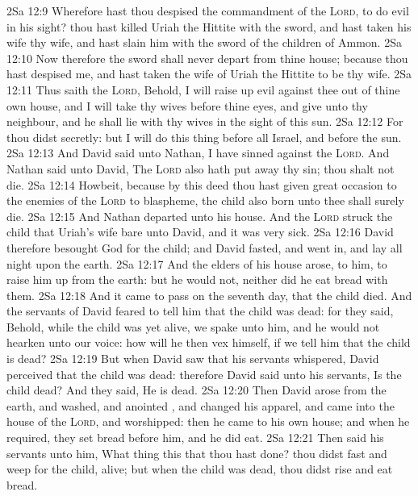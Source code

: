 \vs 2Sa 12:9 Wherefore hast thou despised the commandment of the \textsc{Lord}, to do evil in his sight? thou hast killed Uriah the Hittite with the sword, and hast taken his wife  thy wife, and hast slain him with the sword of the children of Ammon.
\vs 2Sa 12:10 Now therefore the sword shall never depart from thine house; because thou hast despised me, and hast taken the wife of Uriah the Hittite to be thy wife.
\vs 2Sa 12:11 Thus saith the \textsc{Lord}, Behold, I will raise up evil against thee out of thine own house, and I will take thy wives before thine eyes, and give  unto thy neighbour, and he shall lie with thy wives in the sight of this sun.
\vs 2Sa 12:12 For thou didst  secretly: but I will do this thing before all Israel, and before the sun.
\vs 2Sa 12:13 And David said unto Nathan, I have sinned against the \textsc{Lord}. And Nathan said unto David, The \textsc{Lord} also hath put away thy sin; thou shalt not die.
\vs 2Sa 12:14 Howbeit, because by this deed thou hast given great occasion to the enemies of the \textsc{Lord} to blaspheme, the child also  born unto thee shall surely die.
\vs 2Sa 12:15 And Nathan departed unto his house. And the \textsc{Lord} struck the child that Uriah's wife bare unto David, and it was very sick.
\vs 2Sa 12:16 David therefore besought God for the child; and David fasted, and went in, and lay all night upon the earth.
\vs 2Sa 12:17 And the elders of his house arose,  to him, to raise him up from the earth: but he would not, neither did he eat bread with them.
\vs 2Sa 12:18 And it came to pass on the seventh day, that the child died. And the servants of David feared to tell him that the child was dead: for they said, Behold, while the child was yet alive, we spake unto him, and he would not hearken unto our voice: how will he then vex himself, if we tell him that the child is dead?
\vs 2Sa 12:19 But when David saw that his servants whispered, David perceived that the child was dead: therefore David said unto his servants, Is the child dead? And they said, He is dead.
\vs 2Sa 12:20 Then David arose from the earth, and washed, and anointed , and changed his apparel, and came into the house of the \textsc{Lord}, and worshipped: then he came to his own house; and when he required, they set bread before him, and he did eat.
\vs 2Sa 12:21 Then said his servants unto him, What thing  this that thou hast done? thou didst fast and weep for the child,  alive; but when the child was dead, thou didst rise and eat bread.
